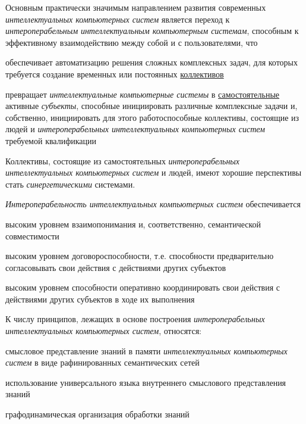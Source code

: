 \begin{textitemize}
	\item Основным практически значимым направлением развития современных \textit{интеллектуальных компьютерных систем} является переход к \textit{интероперабельным} \textit{интеллектуальным компьютерным системам}, способным к эффективному взаимодействию между собой и с пользователями, что
	\begin{textitemize}
		\item обеспечивает автоматизацию решения сложных комплексных задач, для которых требуется создание временных или постоянных \underline{коллективов}
		\item превращает \textit{интеллектуальные компьютерные системы} в \underline{самостоятельные} активные \textit{субъекты}, способные инициировать различные комплексные задачи и, собственно, инициировать для этого работоспособные коллективы, состоящие из людей и \textit{интероперабельных интеллектуальных компьютерных систем} требуемой квалификации 
	\end{textitemize}
	\item Коллективы, состоящие из самостоятельных \textit{интероперабельных интеллектуальных компьютерных систем} и людей, имеют хорошие перспективы стать \textit{синергетическими} системами.
	\item \textit{Интероперабельность интеллектуальных компьютерных систем} обеспечивается
	\begin{textitemize}
		\item высоким уровнем взаимопонимания и, соответственно, семантической совместимости
		\item высоким уровнем договороспособности, т.е. способности предварительно согласовывать свои действия с действиями других субъектов
		\item высоким уровнем способности оперативно координировать свои действия с действиями других субъектов в ходе их выполнения
	\end{textitemize}
	\item К числу принципов, лежащих в основе построения \textit{интероперабельных интеллектуальных компьютерных систем}, относятся:
	\begin{textitemize}
		\item смысловое представление знаний в памяти \textit{интеллектуальных компьютерных систем} в виде рафинированных семантических сетей
		\item использование универсального языка внутреннего смыслового представления знаний
		\item графодинамическая организация обработки знаний

\end{textitemize}
\end{textitemize}
